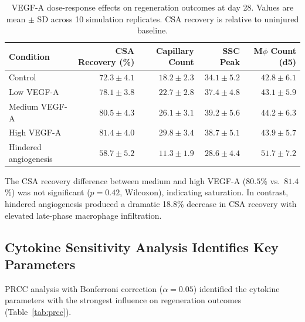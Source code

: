 \documentclass[11pt]{article}
\begin{document}
\begin{table}[H]
\centering
\caption{VEGF-A dose-response effects on regeneration outcomes at day 28. Values are mean $\pm$ SD across 10 simulation replicates. CSA recovery is relative to uninjured baseline.}
\label{tab:vegf}
\begin{tabular}{lrrrr}
\toprule
\textbf{Condition} & \textbf{CSA Recovery (\%)} & \textbf{Capillary Count} & \textbf{SSC Peak} & \textbf{M$\phi$ Count (d5)} \\
\midrule
Control & $72.3 \pm 4.1$ & $18.2 \pm 2.3$ & $34.1 \pm 5.2$ & $42.8 \pm 6.1$ \\
Low VEGF-A & $78.1 \pm 3.8$ & $22.7 \pm 2.8$ & $37.4 \pm 4.8$ & $43.1 \pm 5.9$ \\
Medium VEGF-A & $80.5 \pm 4.3$ & $26.1 \pm 3.1$ & $39.2 \pm 5.6$ & $44.2 \pm 6.3$ \\
High VEGF-A & $81.4 \pm 4.0$ & $29.8 \pm 3.4$ & $38.7 \pm 5.1$ & $43.9 \pm 5.7$ \\
Hindered angiogenesis & $58.7 \pm 5.2$ & $11.3 \pm 1.9$ & $28.6 \pm 4.4$ & $51.7 \pm 7.2$ \\
\bottomrule
\end{tabular}
\end{table}

The CSA recovery difference between medium and high VEGF-A ($80.5$\% vs.\ $81.4$\%) was not significant ($p = 0.42$, Wilcoxon), indicating saturation. In contrast, hindered angiogenesis produced a dramatic 18.8\% decrease in CSA recovery with elevated late-phase macrophage infiltration.

\subsection{Cytokine Sensitivity Analysis Identifies Key Parameters}

PRCC analysis with Bonferroni correction ($\alpha = 0.05$) identified the cytokine parameters with the strongest influence on regeneration outcomes (Table~\ref{tab:prcc}).
\end{document}
